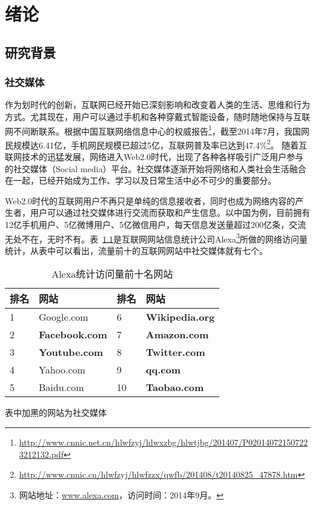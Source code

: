 \chapter{绪论}
\label{Intro}

\section{研究背景}

\subsection{社交媒体}
\label{ch1_social}
作为划时代的创新，互联网已经开始已深刻影响和改变着人类的生活、思维和行为方式。尤其现在，用户可以通过手机和各种穿戴式智能设备，随时随地保持与互联网不间断联系。根据中国互联网络信息中心的权威报告\footnote{\url{http://www.cnnic.net.cn/hlwfzyj/hlwxzbg/hlwtjbg/201407/P020140721507223212132.pdf}}，截至2014年7月，我国网民规模达6.41亿，手机网民规模已超过5亿，互联网普及率已达到47.4\%\footnote{\url{http://www.cnnic.cn/hlwfzyj/hlwfzzx/qwfb/201408/t20140825\_47878.htm}}。
随着互联网技术的迅猛发展，网络进入Web2.0时代，出现了各种各样吸引广泛用户参与的社交媒体（Social media）平台。社交媒体逐渐开始将网络和人类社会生活融合在一起，已经开始成为工作、学习以及日常生活中必不可少的重要部分。


Web2.0时代的互联网用户不再只是单纯的信息接收者，同时也成为网络内容的产生者，用户可以通过社交媒体进行交流而获取和产生信息。以中国为例，目前拥有12亿手机用户、5亿微博用户、5亿微信用户，每天信息发送量超过200亿条，交流无处不在，无时不有。表~\ref{tab1-1}是互联网网站信息统计公司Alexa\footnote{网站地址：\url{www.alexa.com}，访问时间：2014年9月。}所做的网络访问量统计，从表中可以看出，流量前十的互联网网站中社交媒体就有七个。

\begin{table}[htp]
\centering
\caption{Alexa统计访问量前十名网站}
\label{tab1-1}
\begin{threeparttable}
 \begin{tabular}{|l|l|l|l|}
 \hline
 排名&网站&排名&网站\\
 \hline
 1& Google.com& 6&\textbf{ Wikipedia.org\tnote{1}}\\
 \hline
 2& \textbf{Facebook.com}& 7& \textbf{Amazon.com}\\
 \hline
 3& \textbf{Youtube.com}& 8& \textbf{Twitter.com}\\
 \hline
 4& Yahoo.com& 9& \textbf{qq.com}\\
 \hline
 5& Baidu.com& 10& \textbf{Taobao.com}\\
 \hline
\end{tabular}
\begin{tablenotes}
  \centering
  \footnotesize
\item[1]表中加黑的网站为社交媒体
\end{tablenotes}
\end{threeparttable}
\end{table}

